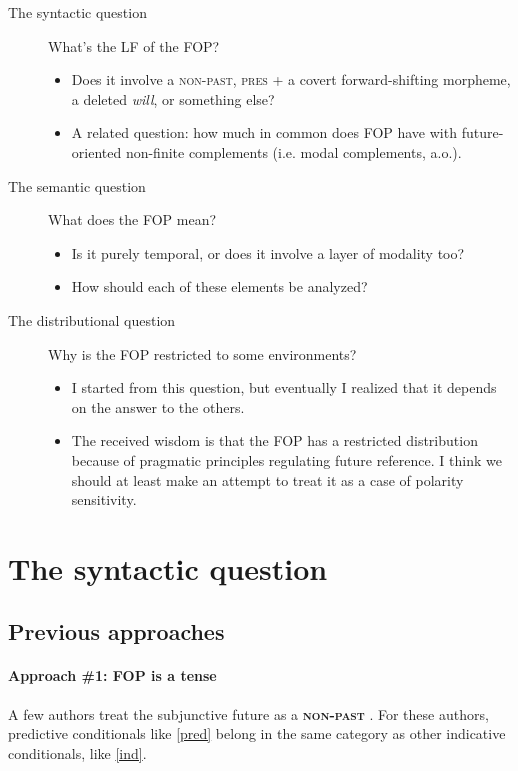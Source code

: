 \documentclass{linghandout}
\begin{document}
\begin{description}
    \item[The syntactic question] What's the LF of the FOP?
    \begin{itemize}
        \item Does it involve a \textsc{non-past}, \textsc{pres} + a covert forward-shifting morpheme, a deleted \textit{will}, or something else?
        \item A related question: how much in common does FOP have with future-oriented non-finite complements (i.e. modal complements, a.o.).
    \end{itemize}
    \item[The semantic question] What does the FOP mean?
    \begin{itemize}
        \item Is it purely temporal, or does it involve a layer of modality too? 
        \item How should each of these elements be analyzed?
    \end{itemize}
    \item[The distributional question] Why is the FOP restricted to some environments?
    \begin{itemize}
        \item I started from this question, but eventually I realized that it depends on the answer to the others.
        \item The received wisdom is that the FOP has a restricted distribution because of pragmatic principles regulating future reference. I think we should at least make an attempt to treat it as a case of polarity sensitivity.
    \end{itemize}
\end{description}

\section{The syntactic question}

\subsection{Previous approaches}

\paragraph{Approach \#1: FOP is a tense}A few authors treat the subjunctive future as a \textbf{\textsc{non-past}} \citep{schulz2008non,kaufmann2005conditional}. For these authors, predictive conditionals like \eqref{pred} belong in the same category as other indicative conditionals, like \eqref{ind}.
\end{document}
